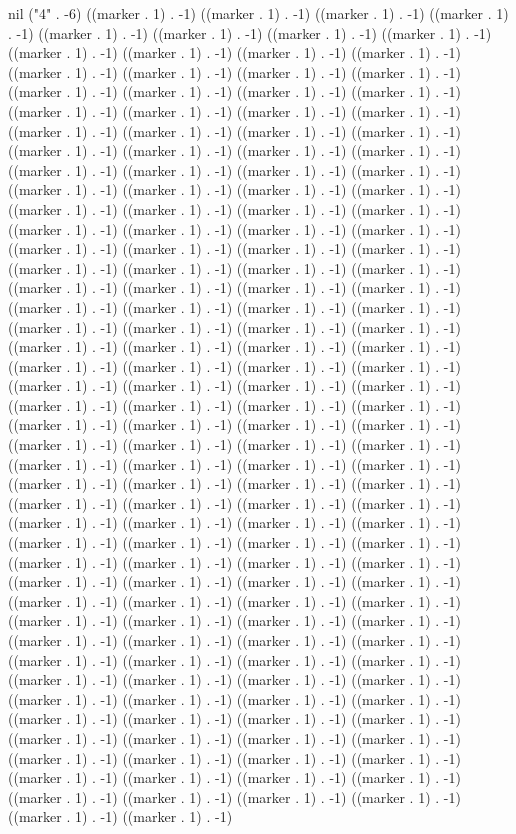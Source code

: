 nil ("4" . -6) ((marker . 1) . -1) ((marker . 1) . -1) ((marker . 1) . -1) ((marker . 1) . -1) ((marker . 1) . -1) ((marker . 1) . -1) ((marker . 1) . -1) ((marker . 1) . -1) ((marker . 1) . -1) ((marker . 1) . -1) ((marker . 1) . -1) ((marker . 1) . -1) ((marker . 1) . -1) ((marker . 1) . -1) ((marker . 1) . -1) ((marker . 1) . -1) ((marker . 1) . -1) ((marker . 1) . -1) ((marker . 1) . -1) ((marker . 1) . -1) ((marker . 1) . -1) ((marker . 1) . -1) ((marker . 1) . -1) ((marker . 1) . -1) ((marker . 1) . -1) ((marker . 1) . -1) ((marker . 1) . -1) ((marker . 1) . -1) ((marker . 1) . -1) ((marker . 1) . -1) ((marker . 1) . -1) ((marker . 1) . -1) ((marker . 1) . -1) ((marker . 1) . -1) ((marker . 1) . -1) ((marker . 1) . -1) ((marker . 1) . -1) ((marker . 1) . -1) ((marker . 1) . -1) ((marker . 1) . -1) ((marker . 1) . -1) ((marker . 1) . -1) ((marker . 1) . -1) ((marker . 1) . -1) ((marker . 1) . -1) ((marker . 1) . -1) ((marker . 1) . -1) ((marker . 1) . -1) ((marker . 1) . -1) ((marker . 1) . -1) ((marker . 1) . -1) ((marker . 1) . -1) ((marker . 1) . -1) ((marker . 1) . -1) ((marker . 1) . -1) ((marker . 1) . -1) ((marker . 1) . -1) ((marker . 1) . -1) ((marker . 1) . -1) ((marker . 1) . -1) ((marker . 1) . -1) ((marker . 1) . -1) ((marker . 1) . -1) ((marker . 1) . -1) ((marker . 1) . -1) ((marker . 1) . -1) ((marker . 1) . -1) ((marker . 1) . -1) ((marker . 1) . -1) ((marker . 1) . -1) ((marker . 1) . -1) ((marker . 1) . -1) ((marker . 1) . -1) ((marker . 1) . -1) ((marker . 1) . -1) ((marker . 1) . -1) ((marker . 1) . -1) ((marker . 1) . -1) ((marker . 1) . -1) ((marker . 1) . -1) ((marker . 1) . -1) ((marker . 1) . -1) ((marker . 1) . -1) ((marker . 1) . -1) ((marker . 1) . -1) ((marker . 1) . -1) ((marker . 1) . -1) ((marker . 1) . -1) ((marker . 1) . -1) ((marker . 1) . -1) ((marker . 1) . -1) ((marker . 1) . -1) ((marker . 1) . -1) ((marker . 1) . -1) ((marker . 1) . -1) ((marker . 1) . -1) ((marker . 1) . -1) ((marker . 1) . -1) ((marker . 1) . -1) ((marker . 1) . -1) ((marker . 1) . -1) ((marker . 1) . -1) ((marker . 1) . -1) ((marker . 1) . -1) ((marker . 1) . -1) ((marker . 1) . -1) ((marker . 1) . -1) ((marker . 1) . -1) ((marker . 1) . -1) ((marker . 1) . -1) ((marker . 1) . -1) ((marker . 1) . -1) ((marker . 1) . -1) ((marker . 1) . -1) ((marker . 1) . -1) ((marker . 1) . -1) ((marker . 1) . -1) ((marker . 1) . -1) ((marker . 1) . -1) ((marker . 1) . -1) ((marker . 1) . -1) ((marker . 1) . -1) ((marker . 1) . -1) ((marker . 1) . -1) ((marker . 1) . -1) ((marker . 1) . -1) ((marker . 1) . -1) ((marker . 1) . -1) ((marker . 1) . -1) ((marker . 1) . -1) ((marker . 1) . -1) ((marker . 1) . -1) ((marker . 1) . -1) ((marker . 1) . -1) ((marker . 1) . -1) ((marker . 1) . -1) ((marker . 1) . -1) ((marker . 1) . -1) ((marker . 1) . -1) ((marker . 1) . -1) ((marker . 1) . -1) ((marker . 1) . -1) ((marker . 1) . -1) ((marker . 1) . -1) ((marker . 1) . -1) ((marker . 1) . -1) ((marker . 1) . -1) ((marker . 1) . -1) ((marker . 1) . -1) ((marker . 1) . -1) ((marker . 1) . -1) ((marker . 1) . -1) ((marker . 1) . -1) ((marker . 1) . -1) ((marker . 1) . -1) ((marker . 1) . -1) ((marker . 1) . -1) ((marker . 1) . -1) ((marker . 1) . -1) ((marker . 1) . -1) ((marker . 1) . -1) ((marker . 1) . -1) ((marker . 1) . -1) ((marker . 1) . -1) ((marker . 1) . -1) ((marker . 1) . -1) 